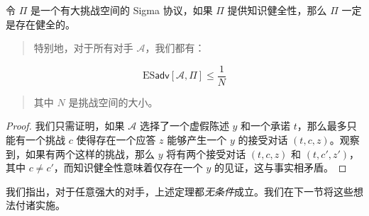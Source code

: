 \begin{theorem}
令 $\Pi$ 是一个有大挑战空间的 Sigma 协议，如果 $\Pi$ 提供知识健全性，那么 $\Pi$ 一定是存在健全的。
\begin{quote}
特别地，对于所有对手 $\mathcal{A}$，我们都有：
\end{quote}
\begin{equation}
\mathrm{ES}\mathsf{adv}[\mathcal{A},{\Pi}]
\leq
\frac{1}{N}
\end{equation}
\begin{quote}
其中 $N$ 是挑战空间的大小。
\end{quote}
\end{theorem}

\begin{proof}
我们只需证明，如果 $\mathcal{A}$ 选择了一个虚假陈述 $y$ 和一个承诺 $t$，那么最多只能有一个挑战 $c$ 使得存在一个应答 $z$ 能够产生一个 $y$ 的接受对话 $(t,c,z)$。观察到，如果有两个这样的挑战，那么 $y$ 将有两个接受对话 $(t,c,z)$ 和 $(t,c',z')$，其中 $c\neq c'$，而知识健全性意味着仅存在一个 $y$ 的见证，这与事实相矛盾。
\end{proof}

我们指出，对于任意强大的对手，上述定理都\emph{无条件}成立。我们在下一节将这些想法付诸实施。